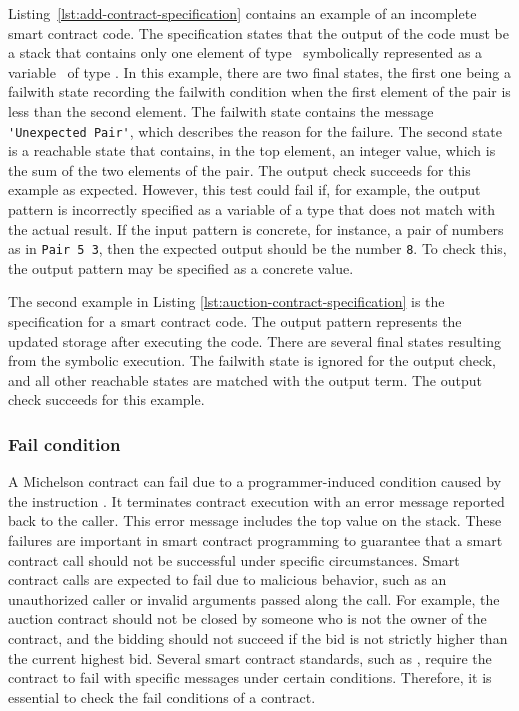 \documentclass[a4paper,USenglish,cleveref, autoref, thm-restate]{lipics-v2021}
\begin{document}
Listing~\ref{lst:add-contract-specification} contains an example of an
incomplete smart contract code. The specification states that the
output of the code must be a stack that contains only one element of
type \TINT\, symbolically represented as a variable \VZ\ of type
\TINT.  In this example, there are two final states, the first one
being a failwith state recording the failwith condition when the first
element of the pair is less than the second element. The failwith
state contains the message \lstinline|'Unexpected Pair'|, which
describes the reason for the failure. The second state is a reachable
state that contains, in the top element, an integer value, which is
the sum of the two elements of the pair. The output check succeeds for
this example as expected. However, this test could fail if, for
example, the output pattern is incorrectly specified as a variable of
a type that does not match with the actual result. If the input
pattern is concrete, for instance, a pair of numbers as in
\lstinline|Pair 5 3|, then the expected output should be the number
\lstinline|8|. To check this,  the output pattern may be specified as
a concrete value.

The second example in Listing \ref{lst:auction-contract-specification}
is the specification for a smart contract code. The output pattern
represents the updated storage after executing the code. There are
several final states resulting from the symbolic execution. The
failwith state is ignored for the output check, and all other
reachable states are matched with the output term. The output check
succeeds for this example.

\subsubsection{Fail condition}
\label{sec:fail-condition}
A Michelson contract can fail due to a programmer-induced condition
caused by the instruction \FAILWITH. It terminates contract execution
with an error message reported back to the caller. This error message
includes the top value on the stack. These failures are important in
smart contract programming to guarantee that a smart contract call
should not be successful under specific circumstances. Smart contract
calls are expected to fail due to malicious behavior, such as an
unauthorized caller or invalid arguments passed along the call. For
example, the auction contract should not be closed by someone who is
not the owner of the contract, and the bidding should not succeed if
the bid is not strictly higher than the current highest bid. Several
smart contract standards, such as
\cite{@ha-supply-a-smart-contract-standard}, require the contract to fail
with specific messages under certain conditions. Therefore, it is
essential to check the fail conditions of a contract.  
\end{document}
